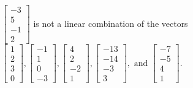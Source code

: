 \begin{exercise}
\begin{exerciseStatement}
  \end{exerciseStatement}
  \begin{exerciseAnswer}
   \(\left[\begin{array}{c}
-3 \\
5 \\
-1 \\
2
\end{array}\right]\) 
  	 is not  
	a linear combination of the vectors \(\left[\begin{array}{c}
1 \\
2 \\
3 \\
0
\end{array}\right] , \left[\begin{array}{c}
-1 \\
1 \\
0 \\
-3
\end{array}\right] , \left[\begin{array}{c}
4 \\
2 \\
-2 \\
1
\end{array}\right] , \left[\begin{array}{c}
-13 \\
-14 \\
-3 \\
3
\end{array}\right] , \text{ and } \left[\begin{array}{c}
-7 \\
-5 \\
4 \\
1
\end{array}\right]\).

	
  


  \end{exerciseAnswer}
\end{exercise}